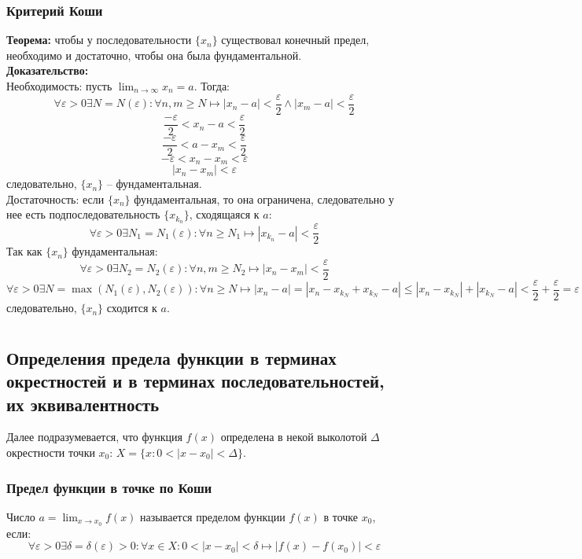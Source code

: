 \documentclass{article}
\begin{document}
        \subsubsection*{Критерий Коши}
        \textbf{Теорема:} чтобы у последовательности $\{x_n\}$ существовал конечный предел, необходимо и достаточно,
        чтобы она была фундаментальной.
        \\
        \textbf{Доказательство:}
        \\
        Необходимость: пусть $\lim_{n\to\infty} x_n = a$. Тогда:
        \[ \forall \varepsilon > 0 \exists N = N(\varepsilon): \forall n, m \ge N \longmapsto |x_n - a| < \frac{\varepsilon}{2} \wedge |x_m - a| < \frac{\varepsilon}{2} \]
        \[ \frac{-\varepsilon}{2} < x_n - a < \frac{\varepsilon}{2} \]
        \[ \frac{-\varepsilon}{2} < a - x_m < \frac{\varepsilon}{2} \]
        \[ -\varepsilon < x_n - x_m < \varepsilon \]
        \[ |x_n - x_m| < \varepsilon \]
        следовательно, $\{x_n\}$ -- фундаментальная.
        \\
        Достаточность: если $\{x_n\}$ фундаментальная, то она ограничена, следовательно у нее есть подпоследовательность $\{x_{k_n}\}$, сходящаяся к $a$:
        \[ \forall \varepsilon > 0 \exists N_1 = N_1(\varepsilon): \forall n \ge N_1 \longmapsto |x_{k_n} - a| < \frac{\varepsilon}{2} \]
        Так как $\{x_n\}$ фундаментальная:
        \[ \forall \varepsilon > 0 \exists N_2 = N_2(\varepsilon): \forall n,m \ge N_2 \longmapsto |x_n - x_m| < \frac{\varepsilon}{2} \]
        \[ \forall \varepsilon > 0 \exists N = \max(N_1(\varepsilon), N_2(\varepsilon)): \forall n \ge N \longmapsto |x_n - a| = |x_n - x_{k_N} + x_{k_N} - a|
        \le |x_n - x_{k_N}| + |x_{k_N} - a| < \frac{\varepsilon}{2} + \frac{\varepsilon}{2} = \varepsilon \]
        следовательно, $\{x_n\}$ сходится к $a$.
        
        
    \newpage
    
    \section{}
    \subsection*{Определения предела функции в терминах окрестностей и в терминах последовательностей, их эквивалентность}
        Далее подразумевается, что функция $f(x)$ определена в некой выколотой $\Delta$ окрестности точки $x_0$: $X = \{x: 0 < |x - x_0| < \Delta\}$.
        \subsubsection*{Предел функции в точке по Коши}
        Число $a = \lim_{x \to x_0} f(x)$ называется пределом функции $f(x)$ в точке $x_0$, если:
        \[ \forall \varepsilon > 0 \exists \delta = \delta(\varepsilon)> 0: \forall x \in X: 0 < |x - x_0| < \delta \longmapsto |f(x) - f(x_0)| < \varepsilon \]
    
\end{document}
